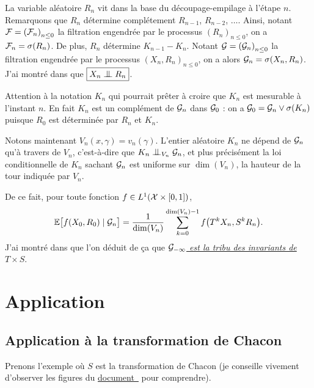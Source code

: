 \documentclass[12pt,a4paper]{article}
\begin{document}
La variable aléatoire $R_n$ vit dans la base du découpage-empilage 
à l'étape $n$. 
Remarquons que $R_n$ détermine complétement $R_{n-1}$, $R_{n-2}$, $\ldots$. 
Ainsi, notant $\mathcal{F}={(\mathcal{F}_n)}_{n \leq 0}$ la filtration engendrée 
par le processus ${(R_n)}_{n \leq 0}$, on a 
$\mathcal{F}_n = \sigma(R_n)$. 
 De plus, $R_n$ détermine $K_{n-1}-K_n$. 
Notant $\mathcal{G}={(\mathcal{G}_n)}_{n \leq 0}$ la filtration engendrée 
par le processus ${(X_n,R_n)}_{n \leq 0}$, on a alors
$\mathcal{G}_n = \sigma(X_n, R_n)$. 
J'ai montré dans \cite{LauScale} que $\boxed{X_n \indep R_n}$.

Attention à la notation $K_n$ qui pourrait prêter à croire que 
$K_n$ est mesurable à l'instant $n$. 
En fait $K_n$ est un complément de $\mathcal{G}_n$ dans $\mathcal{G}_0$ : 
on a $\mathcal{G}_0 = \mathcal{G}_n \vee \sigma(K_n)$ puisque 
$R_0$ est déterminée par $R_n$ et $K_n$. 

Notons maintenant $V_n(x,\gamma)=v_n(\gamma)$. 
L'entier aléatoire $K_n$ ne dépend de $\mathcal{G}_n$ qu'à travers de 
$V_n$, c'est-à-dire que $K_n \indep_{V_n} \GG_n$, et 
plus précisément la loi conditionnelle de $K_n$ sachant $\mathcal{G}_n$ 
est uniforme sur $\dim(V_n)$, la hauteur de la tour indiquée par $V_n$. 

De ce fait, pour toute fonction $f \in L^1(\mathcal{X} \times [0,1])$, 
\begin{equation}\label{eq:conditionalexpectation}
\mathbb{E}\bigl[f(X_0, R_0) \mid \mathcal{G}_n\bigr]
 =\frac{1}{\dim(V_n)}\sum_{k=0}^{\dim(V_n)-1} f\bigl(T^kX_n, S^kR_n \bigr).
\end{equation}
J'ai montré dans \cite{LauScale}  que l'on déduit de ça que 
\uline{\emph{$\mathcal{G}_{-\infty}$ est la tribu des invariants de $T \times S$}}.  





\section{Application}\label{sec:application}

\subsection{Application à la transformation de Chacon}

Prenons l'exemple où $S$ est la transformation de Chacon 
(je conseille vivement d'observer les figures du  \href{https://cdr.lib.unc.edu/indexablecontent/uuid:bfc41b0c-b048-440f-9a57-533e02ea4f76}{document~\cite{AP}} pour comprendre). 
\end{document}

